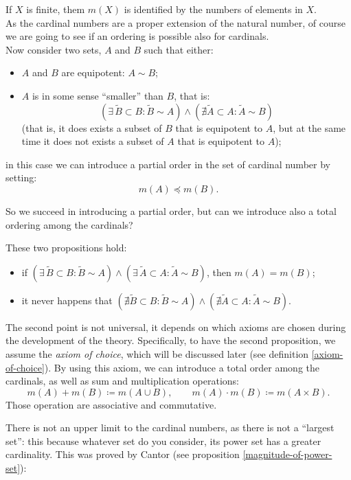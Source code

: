 If $X$ is finite, them $m\left(X\right)$ is identified by the numbers of elements in $X$.\\
As the cardinal numbers are a proper extension of the natural number, of course we are going to see if an ordering is possible also for cardinals.\\
Now consider two sets, $A$ and $B$ such that either:
\begin{itemize}
	\item $A$ and $B$ are equipotent: $A \sim B$;
	\item $A$ is in some sense ``smaller'' than $B$, that is: $$(\exists \, \tilde B \subset B : \tilde B \sim A) \wedge (\nexists \tilde A \subset A : \tilde A \sim B)$$ (that is, it does exists a subset of $B$ that is equipotent to $A$, but at the same time it does not exists a subset of $A$ that is equipotent to $A$);
\end{itemize}
in this case we can introduce a partial order in the set of cardinal number by setting: $$m(A) \preceq m(B).$$

So we succeed in introducing a partial order, but can we introduce also a total ordering among the cardinals?
\begin{theo} \label{cantor-bernstein-theorem}
	These two propositions hold:
	\begin{itemize}
		\item 	if $(\exists \, \tilde B \subset B : \tilde B \sim A) \wedge (\exists \, \tilde A \subset A : \tilde A \sim B)$, then $m\left(A\right)=m\left(B\right)$;
		\item 	it never happens that $(\nexists \tilde B \subset B : \tilde B \sim A) \wedge (\nexists \tilde A \subset A : \tilde A \sim B)$.
	\end{itemize}
\end{theo}

The second point is not universal, it depends on which axioms are chosen during the development of the theory. Specifically, to have the second proposition, we assume the \textit{axiom of choice}, which will be discussed later (see definition \vref{axiom-of-choice}). By using this axiom, we can introduce a total order among the cardinals, as well as sum and multiplication operations:
$$m\left(A\right)+m\left(B\right) \coloneqq m\left(A\cup B\right), \qquad m\left(A\right) \cdot m\left(B\right) \coloneqq m\left(A\times B\right).$$
Those operation are associative and commutative.

There is not an upper limit to the cardinal numbers, as there is not a ``largest set'': this because whatever set do you consider, its power set has a greater cardinality. This was proved by Cantor (see proposition \vref{magnitude-of-power-set}):

